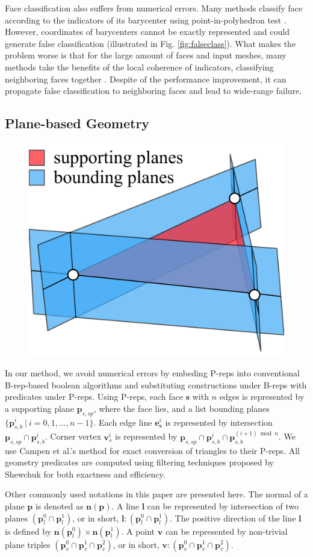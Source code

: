 \documentclass[10pt,journal,compsoc]{IEEEtran}
\begin{document}
Face classification also suffers from numerical errors. Many methods classify face according to the indicators of its barycenter using point-in-polyhedron test \cite{feito2013fast,campen2010exact}. However, coordinates of barycenters cannot be exactly represented and could generate false classification (illustrated in Fig. \ref{fig:falseclass}). What makes the problem worse is that for the large amount of faces and input meshes, many methods \cite{pavic2010hybrid,feito2013fast,ogayar2015deferred,zhou2016mesh} take the benefits of the local coherence of indicators, classifying neighboring faces together . Despite of the performance improvement, it can propagate false classification to neighboring faces and lead to wide-range failure.


\subsection{Plane-based Geometry}

\begin{figure}
\includegraphics[width=1.5 in]{p-reps}
\end{figure}

In our method, we avoid numerical errors by embeding P-reps into conventional B-rep-based boolean algorithms and substituting constructions under B-reps with predicates under P-reps. Using P-reps, each face $\bm{s}$ with $n$ edges is represented by a supporting plane $\bm{p}_{s,sp}$, where the face lies, and a list bounding planes $\{\bm{p}_{s,b}^i \ \vert\  i = 0, 1,...,n-1\}$. Each edge line $\bm{e}_{\bm{s}}^i$ is represented by intersection $\bm{p}_{s,sp} \cap \bm{p}_{s,b}^i$. Corner vertex $\bm{v}_s^i$ is represented by $\bm{p}_{s,sp} \cap \bm{p}_{s,b}^i \cap \bm{p}_{s,b}^{{(i+1)}\bmod{n}}$. We use Campen et al.'s method \cite{campen2010exact} for exact conversion of triangles to their P-reps. All geometry predicates are computed using filtering techniques proposed by Shewchuk \cite{shewchuk1997adaptive} for both exactness and efficiency.


Other commonly used notations in this paper are presented here.
The normal of a plane $\bm{p}$ is denoted as $\bm{n}(\bm{p})$. A line $\bm{l}$ can be represented by intersection of two planes $(\bm{p}_l^0 \cap \bm{p}_l^1)$, or in short, $\bm{l}\colon(\bm{p}_l^0 \cap \bm{p}_l^1)$. The positive direction of the line $\bm{l}$ is defined by $\bm{n}(\bm{p}_l^0) \times \bm{n}(\bm{p}_l^1)$. A point $\bm{v}$ can be represented by non-trivial plane triples $(\bm{p}_v^0 \cap \bm{p}_v^1 \cap \bm{p}_v^2)$, or in short, $\bm{v}\colon(\bm{p}_v^0 \cap \bm{p}_v^1 \cap \bm{p}_v^2)$.
\end{document}
